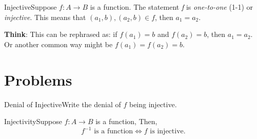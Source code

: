             

    
            \begin{definition}
                {Injective}Suppose \(f\colon A \rightarrow B\) is a function. The statement \textit{f} is \textit{one-to-one} (1-1) or \textit{injective}. This means that \((a_1,b), (a_2,b) \in f\), then \(a_1 = a_2\).
            \end{definition}

            \textbf{Think}: This can be rephrased as: if \(f(a_1) = b\) and \(f(a_2) = b\), then \(a_1 = a_2\). Or another common way might be \(f(a_1) = f(a_2) = b\).

        \section{Problems}


            \begin{exercise}
                {Denial of Injective}Write the denial of \(f\) being injective.
            \end{exercise}
    

    
            \begin{exercise}
                {Injectivity}Suppose \(f\colon A\rightarrow B\) is a function, Then, \[f^{-1} \text{ is a function} \iff f \text{ is injective.}\]
            \end{exercise}
    
